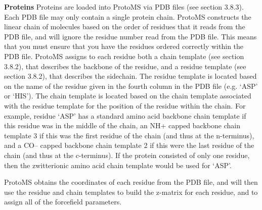 \documentclass[letterpaper,10pt,english]{sphinxmanual}
\begin{document}
\textbf{Proteins}
Proteins are loaded into ProtoMS via PDB files (see section 3.8.3). Each PDB file may only contain a single protein chain. ProtoMS constructs the linear chain of molecules based on the order of residues that it reads from the PDB file, and will ignore the residue number read from the PDB file. This means that you must ensure that you have the residues ordered correctly within the PDB file. ProtoMS assigns to each residue both a chain template (see section 3.8.2), that describes the backbone of the residue, and a residue template (see section 3.8.2), that describes the sidechain. The residue template is located based on the name of the residue given in the fourth column in the PDB file (e.g. ‘ASP’ or ‘HIS’). The chain template is located based on the chain template associated with the residue template for the position of the residue within the chain. For example, residue ‘ASP’ has a standard amino acid backbone chain template if this residue was in the middle of the chain, an NH+ capped backbone chain template 3 if this was the first residue of the chain (and thus at the n-terminus), and a CO-- capped backbone chain template 2 if this were the last residue of the chain (and thus at the c-terminus). If the protein consisted of only one residue, then the zwitterionic amino acid chain template would be used for ‘ASP’.

ProtoMS obtains the coordinates of each residue from the PDB file, and will then use the residue and chain templates to build the z-matrix for each residue, and to assign all of the forcefield parameters.
\end{document}
